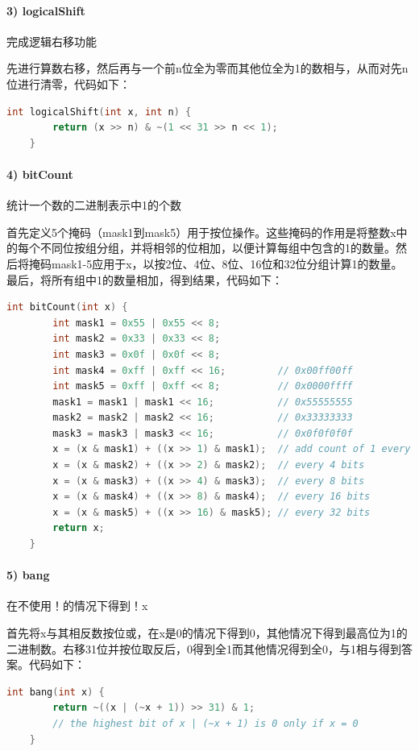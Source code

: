 \documentclass{article}
\begin{document}
    \paragraph{3) logicalShift}完成逻辑右移功能

    先进行算数右移，然后再与一个前n位全为零而其他位全为1的数相与，从而对先n位进行清零，代码如下：
    \begin{lstlisting}[language=C]
    int logicalShift(int x, int n) {
        return (x >> n) & ~(1 << 31 >> n << 1);
    }
\end{lstlisting}
    \paragraph{4) bitCount} 统计一个数的二进制表示中1的个数

    首先定义5个掩码（mask1到mask5）用于按位操作。这些掩码的作用是将整数x中的每个不同位按组分组，并将相邻的位相加，以便计算每组中包含的1的数量。然后将掩码mask1-5应用于x，以按2位、4位、8位、16位和32位分组计算1的数量。最后，将所有组中1的数量相加，得到结果，代码如下：
    \begin{lstlisting}[language=C]
    int bitCount(int x) {
        int mask1 = 0x55 | 0x55 << 8;
        int mask2 = 0x33 | 0x33 << 8;
        int mask3 = 0x0f | 0x0f << 8;
        int mask4 = 0xff | 0xff << 16;         // 0x00ff00ff
        int mask5 = 0xff | 0xff << 8;          // 0x0000ffff
        mask1 = mask1 | mask1 << 16;           // 0x55555555
        mask2 = mask2 | mask2 << 16;           // 0x33333333
        mask3 = mask3 | mask3 << 16;           // 0x0f0f0f0f
        x = (x & mask1) + ((x >> 1) & mask1);  // add count of 1 every 2 bits
        x = (x & mask2) + ((x >> 2) & mask2);  // every 4 bits
        x = (x & mask3) + ((x >> 4) & mask3);  // every 8 bits
        x = (x & mask4) + ((x >> 8) & mask4);  // every 16 bits
        x = (x & mask5) + ((x >> 16) & mask5); // every 32 bits
        return x;
    }
\end{lstlisting}
    \paragraph{5) bang} 在不使用！的情况下得到！x

    首先将x与其相反数按位或，在x是0的情况下得到0，其他情况下得到最高位为1的二进制数。右移31位并按位取反后，0得到全1而其他情况得到全0，与1相与得到答案。代码如下：
    \begin{lstlisting}[language=C]
    int bang(int x) {
        return ~((x | (~x + 1)) >> 31) & 1; 
        // the highest bit of x | (~x + 1) is 0 only if x = 0
    }
\end{lstlisting}
\end{document}
